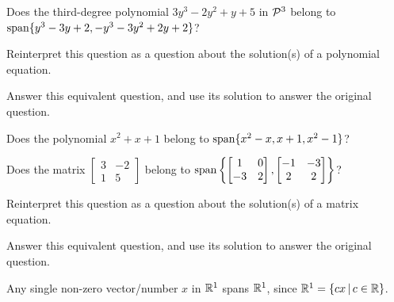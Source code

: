 \begin{activity}{10}
  Does the third-degree polynomial \(3y^3-2y^2+y+5\) in \(\P^3\) belong to
  \(\vspan\{y^3-3y+2,-y^3-3y^2+2y+2\}\)?
  \begin{subactivity}
  	Reinterpret this question as a question about the solution(s) of a polynomial equation.
  \end{subactivity}
  \begin{subactivity}
  	Answer this equivalent question, and use its solution to answer the original
    question.
  \end{subactivity}
\end{activity}

\begin{activity}{5}
  Does the polynomial  \(x^2+x+1\) belong to
  \(\vspan\{x^2-x,x+1, x^2-1\}\)?
\end{activity}

\begin{activity}{5}
  Does the matrix \(\begin{bmatrix}3&-2\\1&5\end{bmatrix}\) belong to
  \(\vspan\left\{\begin{bmatrix}1&0\\-3&2\end{bmatrix},
  \begin{bmatrix}-1&-3\\2&2\end{bmatrix}\right\}\)?
  \begin{subactivity}
  	Reinterpret this question as a question about the solution(s) of a matrix equation.
  \end{subactivity}
  \begin{subactivity}
  	Answer this equivalent question, and use its solution to answer the original
    question.
  \end{subactivity}
\end{activity}


\begin{observation}
Any single non-zero vector/number \(x\) in \(\IR^1\) spans \(\IR^1\),
since \(\IR^1=\setBuilder{cx}{c\in\IR}\).

\begin{center}
\end{center}
\end{observation}


